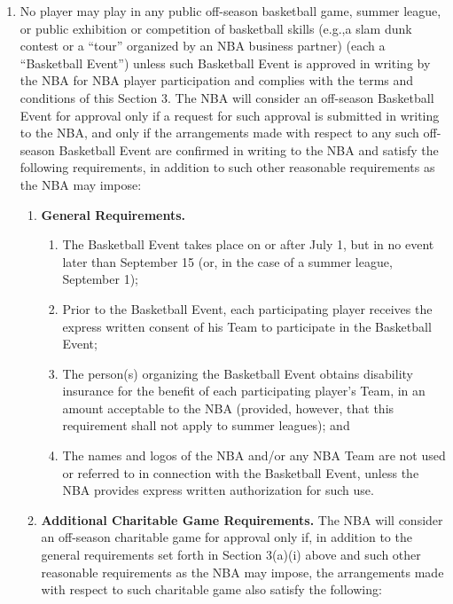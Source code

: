 \documentclass[
]{book}
\providecommand{\tightlist}{%
  \setlength{\itemsep}{0pt}\setlength{\parskip}{0pt}}
\begin{document}
\begin{enumerate}
\def\labelenumi{(\alph{enumi})}
\tightlist
\item
  No player may play in any public off-season basketball game, summer league, or public exhibition or competition of basketball skills (e.g.,a slam dunk contest or a ``tour'' organized by an NBA business partner) (each a ``Basketball Event'') unless such Basketball Event is approved in writing by the NBA for NBA player participation and complies with the terms and conditions of this Section 3. The NBA will consider an off-season Basketball Event for approval only if a request for such approval is submitted in writing to the NBA, and only if the arrangements made with respect to any such off-season Basketball Event are confirmed in writing to the NBA and satisfy the following requirements, in addition to such other reasonable requirements as the NBA may impose:

  \begin{enumerate}
  \def\labelenumii{(\roman{enumii})}
  \tightlist
  \item
    \textbf{General Requirements.}

    \begin{enumerate}
    \def\labelenumiii{(\arabic{enumiii})}
    \tightlist
    \item
      The Basketball Event takes place on or after July 1, but in no event later than September 15 (or, in the case of a summer league, September 1);
    \item
      Prior to the Basketball Event, each participating player receives the express written consent of his Team to participate in the Basketball Event;
    \item
      The person(s) organizing the Basketball Event obtains disability insurance for the benefit of each participating player's Team, in an amount acceptable to the NBA (provided, however, that this requirement shall not apply to summer leagues); and
    \item
      The names and logos of the NBA and/or any NBA Team are not used or referred to in connection with the Basketball Event, unless the NBA provides express written authorization for such use.
    \end{enumerate}
  \item
    \textbf{Additional Charitable Game Requirements.} The NBA will consider an off-season charitable game for approval only if, in addition to the general requirements set forth in Section 3(a)(i) above and such other reasonable requirements as the NBA may impose, the arrangements made with respect to such charitable game also satisfy the following:


\end{enumerate}
\end{enumerate}
\end{document}
